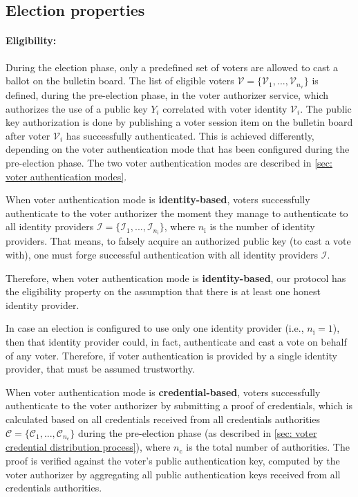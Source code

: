 \subsection{Election properties} \label{sec: election properties}


\paragraph{Eligibility:}
During the election phase, only a predefined set of voters are allowed to cast a ballot on the bulletin board. The list of eligible voters $\boldsymbol{\mathcal{V}} = \{ \mathcal{V}_1, ..., \mathcal{V}_{n_\mathrm{v}} \}$ is defined, during the pre-election phase, in the voter authorizer service, which authorizes the use of a public key $Y_i$ correlated with voter identity $\mathcal{V}_i$. The public key authorization is done by publishing a voter session item on the bulletin board after voter $\mathcal{V}_i$ has successfully authenticated. This is achieved differently, depending on the voter authentication mode that has been configured during the pre-election phase. The two voter authentication modes are described in \cref{sec: voter authentication modes}.

When voter authentication mode is \textbf{identity-based}, voters successfully authenticate to the voter authorizer the moment they manage to authenticate to all identity providers $\boldsymbol{\mathcal{I}} = \{ \mathcal{I}_1, ..., \mathcal{I}_{n_\mathrm{i}} \}$, where $n_\mathrm{i}$ is the number of identity providers. That means, to falsely acquire an authorized public key (to cast a vote with), one must forge successful authentication with all identity providers $\boldsymbol{\mathcal{I}}$.

Therefore, when voter authentication mode is \textbf{identity-based}, our protocol has the eligibility property on the assumption that there is at least one honest identity provider.

In case an election is configured to use only one identity provider (i.e., $n_\mathrm{i} = 1$), then that identity provider could, in fact, authenticate and cast a vote on behalf of any voter. Therefore, if voter authentication is provided by a single identity provider, that must be assumed trustworthy.

When voter authentication mode is \textbf{credential-based}, voters successfully authenticate to the voter authorizer by submitting a proof of credentials, which is calculated based on all credentials received from all credentials authorities $\boldsymbol{\mathcal{C}} = \{ \mathcal{C}_1, ..., \mathcal{C}_{n_\mathrm{c}} \}$ during the pre-election phase (as described in \cref{sec: voter credential distribution process}), where $n_\mathrm{c}$ is the total number of authorities. The proof is verified against the voter's public authentication key, computed by the voter authorizer by aggregating all public authentication keys received from all credentials authorities.

